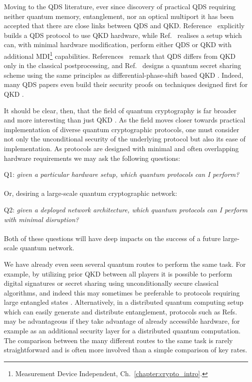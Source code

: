 Moving to the QDS literature, ever since discovery of practical QDS requiring neither quantum memory, entanglement, nor an optical multiport it has been accepted that there are close links between QDS and QKD. Reference~\cite{Wallden2015} explicitly builds a QDS protocol to use QKD hardware, while Ref.~\cite{Roberts2017} realises a setup which can, with minimal hardware modification, perform either QDS or QKD with additional MDI\footnote{Measurement Device Independent, Ch.~\ref{chapter:crypto_intro}.} capabilities. References~\cite{Collins2016, Yin2017, Yin2017c, An2019, Roberts2017} remark that QDS differs from QKD only in the classical postprocessing, and Ref.~\cite{Wei2018} designs a quantum secret sharing scheme using the same principles as differential-phase-shift based QKD \cite{Sasaki2014}. Indeed, many QDS papers even build their security proofs on techniques designed first for QKD \cite{Kogias2017, Grice2019, Wei2018, Grice2015, Armstrong2015}.


It should be clear, then, that the field of quantum cryptography is far broader and more interesting than just QKD \cite{Broadbent2015}. As the field moves closer towards practical implementation of diverse quantum cryptographic protocols, one must consider not only the unconditional security of the underlying protocol but also its ease of implementation. As protocols are designed with minimal and often overlapping hardware requirements we may ask the following questions:
\\
\par
Q1:\emph{ given a particular hardware setup, which quantum protocols can I perform?}
\\
\\
\noindent Or, desiring a large-scale quantum cryptographic network:
\\
\par
Q2:\emph{ given a deployed network architecture, which quantum protocols can I perform with minimal disruption?}
\\
\\
\noindent Both of these questions will have deep impacts on the success of a future large-scale quantum network. 

We have already even seen several quantum routes to perform the same task. For example, by utilizing prior QKD between all players it is possible to perform digital signatures \cite{Wallden2015, Amiri2016a} or secret sharing \cite{Shamir1979, Blakley1979, Schneier1996} using unconditionally secure classical algorithms, and indeed this may sometimes be preferable to protocols requiring large entangled states \cite{Gottesman2001, Hillery1999}. Alternatively, in a distributed quantum computing setup which can easily generate and distribute entanglement, protocols such as Refs.~\cite{Bell2014, Kogias2017} may be advantageous if they take advantage of already accessible hardware, for example as an additional security layer for a distributed quantum computation. The comparison between the many different routes to the same task is rarely straightforward and is often more involved than a simple comparison of key rates.

